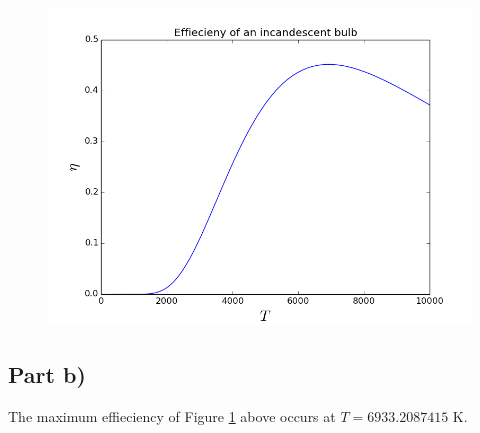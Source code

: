 \documentclass[a4paper,12pt]{article}
\begin{document}
\begin{figure}[H]
\centering
\includegraphics[width = \linewidth]{lab4q6a.png}
\caption{}
\label{fig:q6}
\end{figure}

\subsection{Part b)}

The maximum effieciency of Figure \ref{fig:q6} above occurs at $T = 6933.2087415$ K.
\end{document}
